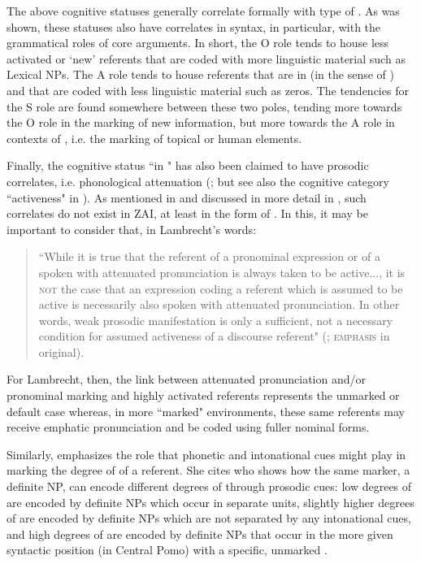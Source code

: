 The above cognitive statuses generally correlate formally with type of . As was shown, these statuses also have correlates in syntax, in particular, with the grammatical roles of core arguments. In short, the O role tends to house less activated or `new' referents that are coded with more linguistic material such as Lexical NPs. The A role tends to house referents that are in  (in the sense of \citealt{gundel1993}) and that are coded with less linguistic material such as zeros. The tendencies for the S role are found somewhere between these two poles, tending more towards the O role in the marking of new information, but more towards the A role in contexts of , i.e. the marking of topical or human elements. 

Finally, the cognitive status ``in " has also been claimed to have prosodic correlates, i.e. phonological attenuation (\citealt[285]{gundel1993}; but see also the cognitive category ``activeness" in \citealt{lambrecht1994,ariel1990,ariel2001}). As mentioned in  and discussed in more detail in , such correlates do not exist in ZAI, at least in the form of . In this, it may be important to consider that, in Lambrecht's words:

\begin{quote} ``While it is true that the referent of a pronominal expression or of a  spoken with attenuated pronunciation is always taken to be active..., it is \textsc{not} the case that an expression coding a referent which is assumed to be active is necessarily also spoken with attenuated pronunciation. In other words, weak prosodic manifestation is only a sufficient, not a necessary condition for assumed activeness of a discourse referent" (\citealt[97]{lambrecht1994}; \textsc{emphasis} in original).
\end{quote}
 
For Lambrecht, then, the link between attenuated pronunciation and/or pronominal marking and highly activated referents represents the unmarked or default case whereas, in more ``marked" environments, these same referents may receive emphatic pronunciation and be coded using fuller nominal forms.

Similarly, \citet[50]{ariel2001} emphasizes the role that phonetic and intonational cues might play in marking the degree of  of a referent. She cites \citet{mithun1995} who shows how the same  marker, a definite NP, can encode different degrees of  through prosodic cues: low degrees of  are encoded by definite NPs which occur in separate  units, slightly higher degrees of  are encoded by definite NPs which are not separated by any intonational cues, and high degrees of  are encoded by definite NPs that occur in the more given syntactic position (in Central Pomo) with a specific, unmarked . 


